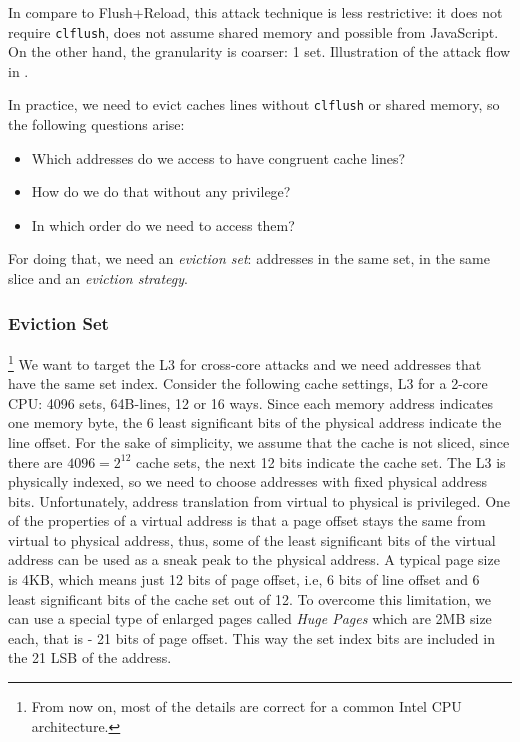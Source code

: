 \noindent In compare to Flush+Reload, this attack technique is less restrictive:
it does not require \texttt{clflush}, does not assume shared memory and possible
from JavaScript. On the other hand, the granularity is coarser: 1 set.
Illustration of the attack flow in .

In practice, we need to evict caches lines without \texttt{clflush} or shared
memory, so the following questions arise:
\begin{itemize}
    \item Which addresses do we access to have congruent cache lines?
    \item How do we do that without any privilege?
    \item In which order do we need to access them?
\end{itemize}
For doing that, we need an \textit{eviction set}: addresses in the same set, in
the same slice and an \textit{eviction strategy}.

\subsubsection{Eviction Set}
\label{subsubsec:evictionset}
\footnote{From now on, most of the details are correct for a common Intel CPU architecture.}
We want to target the L3 for cross-core attacks and we need addresses that have
the same set index. Consider the following cache settings, L3 for a 2-core CPU:
4096 sets, 64B-lines, 12 or 16 ways. Since each memory address indicates one
memory byte, the 6 least significant bits of the physical address indicate the
line offset. For the sake of simplicity, we assume that the cache is not sliced,
since there are $4096=2^{12}$ cache sets, the next 12 bits indicate the cache
set. The L3 is physically indexed, so we need to choose addresses with fixed
physical address bits. Unfortunately, address translation from virtual to
physical is privileged. One of the properties of a virtual address is that a
page offset stays the same from virtual to physical address, thus, some of the
least significant bits of the virtual address can be used as a sneak peak to the
physical address. A typical page size is 4KB, which means just 12 bits of page
offset, i.e, 6 bits of line offset and 6 least significant bits of the cache set
out of 12. To overcome this limitation, we can use a special type of enlarged
pages called \textit{Huge Pages} which are 2MB size each, that is - 21 bits of
page offset. This way the set index bits are included in the 21 LSB of the
address.

